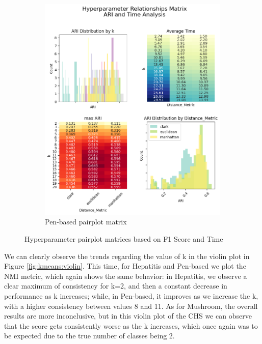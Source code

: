 \begin{figure}[H]
\begin{subfigure}{0.49\textwidth}
        \includegraphics[width=\linewidth]{figures/KMeans/penbased_hyperparameter_pairplot_matrix.png}
        \caption{Pen-based pairplot matrix}
    \end{subfigure}
    \caption{Hyperparameter pairplot matrices based on F1 Score and Time}
    \label{fig:pairplot}
\end{figure}

We can clearly observe the trends regarding the value of k in the violin plot in Figure \ref{fig:kmeans:violin}. This time, for Hepatitis and Pen-based we plot the NMI metric, which again shows the same behavior: in Hepatitis, we observe a clear maximum of consistency for k=2, and then a constant decrease in performance as k increases; while, in Pen-based, it improves as we increase the k, with a higher consistency between values 8 and 11. As for Mushroom, the overall results are more inconclusive, but in this violin plot of the CHS we can observe that the score gets consistently worse as the k increases, which once again was to be expected due to the true number of classes being 2.

